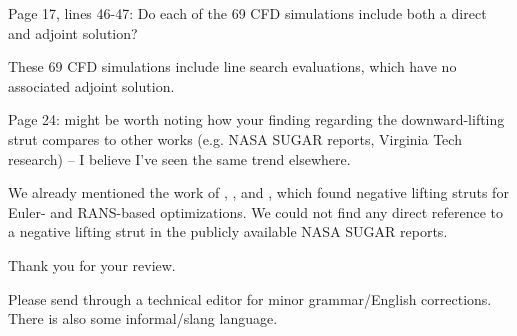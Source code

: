 \documentclass{mdolab-response}
\begin{document}
\begin{revcom}
    Page 17, lines 46-47: Do each of the 69 CFD simulations include both a direct and adjoint solution?
\end{revcom}

\begin{response}
    These 69 CFD simulations include line search evaluations, which have no associated adjoint solution.
\end{response}


\begin{revcom}
    Page 24: might be worth noting how your finding regarding the downward-lifting strut compares to other works (e.g. NASA SUGAR reports, Virginia Tech research) – I believe I've seen the same trend elsewhere.
\end{revcom}

\begin{response}
    We already mentioned the work of \citet{gagnon2014tbw,gagnon2016euler}, \citet{Ivaldi2015a}, and \citet{Hwang2014a}, which found negative lifting struts for Euler- and RANS-based optimizations.
    We could not find any direct reference to a negative lifting strut in the publicly available NASA SUGAR reports.
\end{response}


Thank you for your review.


\newreviewer


\begin{revcom}
    Please send through a technical editor for minor grammar/English corrections. There is also some informal/slang language.
\end{revcom}
\end{document}
